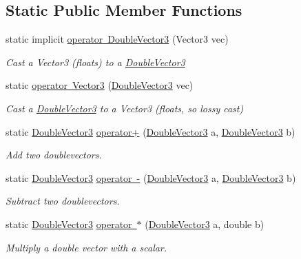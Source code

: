 \subsection*{Static Public Member Functions}
\begin{DoxyCompactItemize}
\item 
static implicit \mbox{\hyperlink{class_double_vector3_a6d17dc0df1592c4358d677a68b133832}{operator Double\+Vector3}} (Vector3 vec)
\begin{DoxyCompactList}\small\item\em Cast a Vector3 (floats) to a \mbox{\hyperlink{class_double_vector3}{Double\+Vector3}} \end{DoxyCompactList}\item 
static \mbox{\hyperlink{class_double_vector3_a74319964445fa87e6f626a9034846474}{operator Vector3}} (\mbox{\hyperlink{class_double_vector3}{Double\+Vector3}} vec)
\begin{DoxyCompactList}\small\item\em Cast a \mbox{\hyperlink{class_double_vector3}{Double\+Vector3}} to a Vector3 (floats, so lossy cast) \end{DoxyCompactList}\item 
static \mbox{\hyperlink{class_double_vector3}{Double\+Vector3}} \mbox{\hyperlink{class_double_vector3_a411c82aaca8d68a748acbc659d263edb}{operator+}} (\mbox{\hyperlink{class_double_vector3}{Double\+Vector3}} a, \mbox{\hyperlink{class_double_vector3}{Double\+Vector3}} b)
\begin{DoxyCompactList}\small\item\em Add two doublevectors. \end{DoxyCompactList}\item 
static \mbox{\hyperlink{class_double_vector3}{Double\+Vector3}} \mbox{\hyperlink{class_double_vector3_aca5834e95f528046ba250127d6ffcf56}{operator -\/}} (\mbox{\hyperlink{class_double_vector3}{Double\+Vector3}} a, \mbox{\hyperlink{class_double_vector3}{Double\+Vector3}} b)
\begin{DoxyCompactList}\small\item\em Subtract two doublevectors. \end{DoxyCompactList}\item 
static \mbox{\hyperlink{class_double_vector3}{Double\+Vector3}} \mbox{\hyperlink{class_double_vector3_adf389425fb8a1e1ec3d8ef65fb1f2846}{operator $\ast$}} (\mbox{\hyperlink{class_double_vector3}{Double\+Vector3}} a, double b)
\begin{DoxyCompactList}\small\item\em Multiply a double vector with a scalar. \end{DoxyCompactList}\item 

\end{DoxyCompactItemize}
